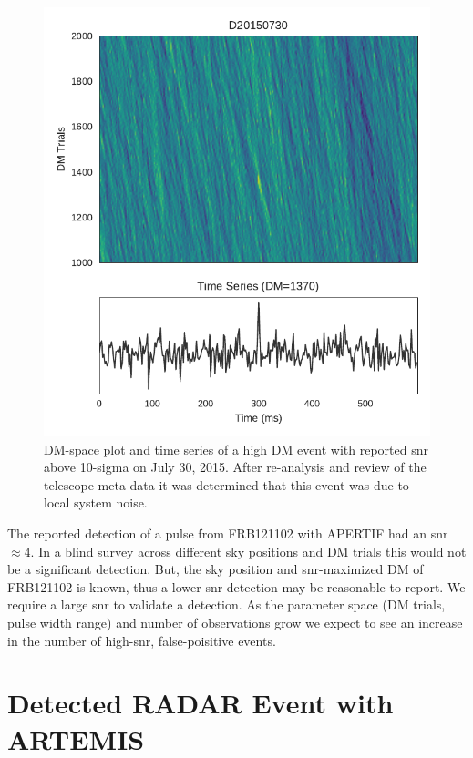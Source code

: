 \documentclass[a4paper,fleqn,usenatbib]{mnras}
\begin{document}
\begin{figure}
    \includegraphics[width=1.0\linewidth]{figures/D20150730_buf23_Beam6_dmtrial.pdf}
    \caption{DM-space plot and time series of a high DM event with reported
    \gls{snr} above 10-sigma on July 30, 2015. After re-analysis and review of
    the telescope meta-data it was determined that this event was due to local
    system noise.
    }
    \label{fig:D20150730}
\end{figure}

The reported detection of a pulse from FRB121102 with APERTIF \citep{atel10693}
had an \gls{snr}$\approx 4$. In a blind survey across different sky positions
and DM trials this would not be a significant detection. But, the sky position
and \gls{snr}-maximized DM of FRB121102 is known, thus a lower \gls{snr}
detection may be reasonable to report.  We require a large \gls{snr} to validate
a detection.  As the parameter space (DM trials, pulse width range) and number
of observations grow we expect to see an increase in the number of
high-\gls{snr}, false-poisitive events.

\section{Detected RADAR Event with ARTEMIS}
\label{sec:LOFAR_RADAR}
\end{document}
